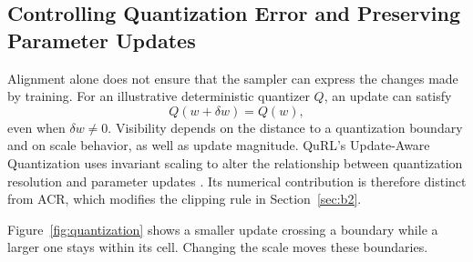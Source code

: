 \subsection{Controlling Quantization Error and Preserving Parameter Updates}\label{sec:a2}
Alignment alone does not ensure that the sampler can express the changes made by training. For an illustrative deterministic quantizer $Q$, an update can satisfy
\begin{equation}\label{eq:quantupdate}
Q(w+\delta w)=Q(w),
\end{equation}
even when $\delta w\ne0$. Visibility depends on the distance to a quantization boundary and on scale behavior, as well as update magnitude. QuRL's Update-Aware Quantization uses invariant scaling to alter the relationship between quantization resolution and parameter updates \citep{qurl}. Its numerical contribution is therefore distinct from ACR, which modifies the clipping rule in Section~\ref{sec:b2}.

Figure~\ref{fig:quantization} shows a smaller update crossing a boundary while a larger one stays within its cell. Changing the scale moves these boundaries.

